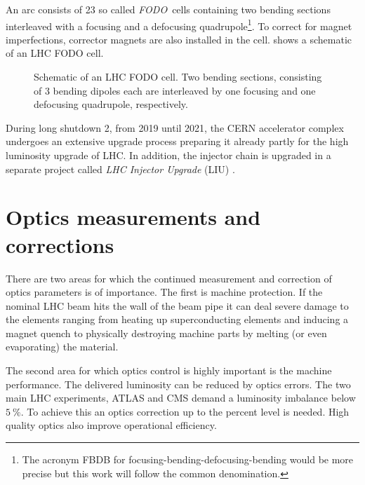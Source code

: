 An arc consists of 23 so called \emph{FODO}~cells containing two bending sections interleaved with
a focusing and a defocusing quadrupole\footnote{
    The acronym FBDB for focusing-bending-defocusing-bending would be more precise but this work will follow
    the common denomination.
}.
To correct for magnet imperfections, corrector magnets are also installed in the cell.
 shows a schematic of an LHC FODO cell.
%
\begin{figure}[h]
    \centering
     
    \caption{
        Schematic of an LHC FODO cell. Two bending sections, consisting of 3 bending dipoles each
        are interleaved by one focusing and one defocusing quadrupole, respectively.
    }
    \label{fig_fodo}
\end{figure}
%
During long shutdown 2, from 2019 until 2021, the CERN accelerator complex undergoes an extensive upgrade process 
preparing it already partly for the high luminosity upgrade of LHC.
In addition, the injector chain is upgraded in a separate project called \emph{LHC Injector Upgrade} (LIU) \cite{Hanke2017,Bartosik2017}.

\section{Optics measurements and corrections}

There are two areas for which the continued measurement and correction of optics parameters is of
importance. The first is machine protection. If the nominal LHC beam hits the wall of the beam pipe
it can deal severe damage to the elements ranging from heating up superconducting elements and
inducing a magnet quench to physically destroying machine parts by melting (or even evaporating) the
material.

The second area for which  optics control is highly important is the machine performance.
The delivered luminosity can be reduced by optics errors.
The two main LHC experiments, ATLAS and CMS demand a luminosity imbalance below $\SI{5}{\percent}$.
To achieve this an optics correction up to the percent level is needed.
High quality optics also improve operational efficiency.

